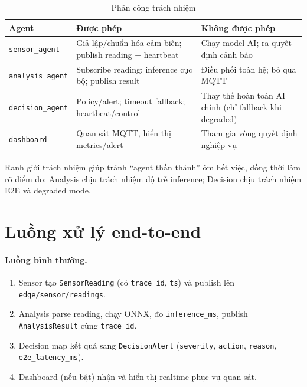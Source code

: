 \documentclass[12pt,a4paper,oneside]{report}
\newcommand{\code}[1]{\texttt{#1}}
\newcommand{\agent}[1]{\texttt{#1}}
\begin{document}
\begin{table}[htbp]
  \centering
  \caption{Phân công trách nhiệm}
  \label{tab:vai-tro}
  \begin{tabular}{p{2.5cm}p{5.5cm}p{5.0cm}}
    \toprule
    \textbf{Agent} & \textbf{Được phép} & \textbf{Không được phép} \\
    \midrule
    \agent{sensor\_agent} & Giả lập/chuẩn hóa cảm biến; publish reading + heartbeat & Chạy model AI; ra quyết định cảnh báo \\
    \agent{analysis\_agent} & Subscribe reading; inference cục bộ; publish result & Điều phối toàn hệ; bỏ qua MQTT \\
    \agent{decision\_agent} & Policy/alert; timeout fallback; heartbeat/control & Thay thế hoàn toàn AI chính (chỉ fallback khi degraded) \\
    \agent{dashboard} & Quan sát MQTT, hiển thị metrics/alert & Tham gia vòng quyết định nghiệp vụ \\
    \bottomrule
  \end{tabular}
\end{table}

Ranh giới trách nhiệm giúp tránh ``agent thần thánh'' ôm hết việc, đồng thời làm rõ điểm đo: Analysis chịu trách nhiệm độ trễ inference; Decision chịu trách nhiệm E2E và degraded mode.

\section{Luồng xử lý end-to-end}

\paragraph{Luồng bình thường.}
\begin{enumerate}
  \item Sensor tạo \code{SensorReading} (có \code{trace\_id}, \code{ts}) và publish lên \code{edge/sensor/readings}.
  \item Analysis parse reading, chạy ONNX, đo \code{inference\_ms}, publish \code{AnalysisResult} cùng \code{trace\_id}.
  \item Decision map kết quả sang \code{DecisionAlert} (\code{severity}, \code{action}, \code{reason}, \code{e2e\_latency\_ms}).
  \item Dashboard (nếu bật) nhận và hiển thị realtime phục vụ quan sát.
\end{enumerate}
\end{document}
